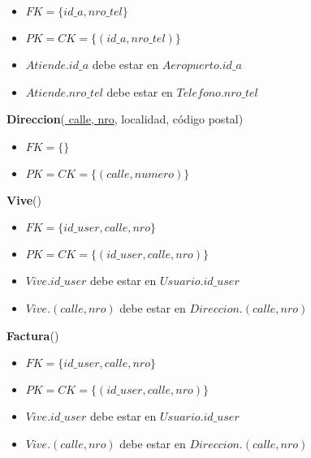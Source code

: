\begin{itemize}[noitemsep]
    \item $FK = \{id\_a, nro\_tel\}$
    \item $PK = CK = \{(id\_a, nro\_tel)\}$
    \item $Atiende.id\_a$ debe estar en $Aeropuerto.id\_a$
    \item $Atiende.nro\_tel$ debe estar en $Telefono.nro\_tel$
\end{itemize}


\vspace*{0.1cm}
\noindent
\textbf{Direccion}(\underline{
	calle, 
	nro}, 
    localidad, 
    código postal)

\begin{itemize}[noitemsep]
    \item $FK = \{\}$
    \item $PK = CK = \{(calle, numero)\}$    
\end{itemize}


\vspace*{0.1cm}
\noindent
\textbf{Vive}(\underline{})

\begin{itemize}[noitemsep]
    \item $FK = \{id\_user, calle, nro\}$
    \item $PK = CK = \{(id\_user, calle, nro)\}$
    \item $Vive.id\_user$ debe estar en $Usuario.id\_user$
    \item $Vive.(calle, nro)$ debe estar en $Direccion.(calle, nro)$
\end{itemize}


\vspace*{0.1cm}
\noindent
\textbf{Factura}(\underline{})

\begin{itemize}[noitemsep]
    \item $FK = \{id\_user, calle, nro\}$
    \item $PK = CK = \{(id\_user, calle, nro)\}$
    \item $Vive.id\_user$ debe estar en $Usuario.id\_user$
    \item $Vive.(calle, nro)$ debe estar en $Direccion.(calle, nro)$
\end{itemize}

